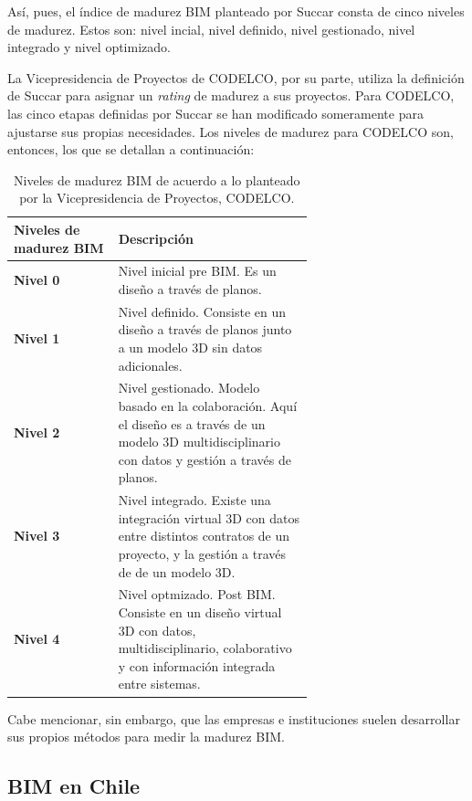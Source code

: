Así, pues, el índice de madurez BIM planteado por Succar consta de cinco niveles de madurez. Estos son: nivel incial, nivel definido, nivel gestionado, nivel integrado y nivel optimizado.

La Vicepresidencia de Proyectos de CODELCO, por su parte, utiliza la definición de Succar para asignar un \textit{rating} de madurez a sus proyectos. Para CODELCO, las cinco etapas definidas por Succar se han modificado someramente para ajustarse sus propias necesidades. Los niveles de madurez para CODELCO son, entonces, los que se detallan a continuación:

\begin{table}[H]
    \centering
    \caption{Niveles de madurez BIM de acuerdo a lo planteado por la Vicepresidencia de Proyectos, CODELCO.}
    \label{tab:niveles-madurez-codelco}
    \begin{tabular}{l p{0.65\linewidth}}
        \toprule
        \textbf{Niveles de madurez BIM} & \textbf{Descripción} \\
        \midrule
        \textbf{Nivel 0} & Nivel inicial pre BIM. Es un diseño a través de planos. \\
        \hline
        \textbf{Nivel 1} & Nivel definido. Consiste en un diseño a través de planos junto a un modelo 3D sin datos adicionales. \\
        \hline
        \textbf{Nivel 2} & Nivel gestionado. Modelo basado en la colaboración. Aquí el diseño es a través de un modelo 3D multidisciplinario con datos y gestión a través de planos. \\
        \hline
        \textbf{Nivel 3} & Nivel integrado. Existe una integración virtual 3D con datos entre distintos contratos de un proyecto, y la gestión a través de de un modelo 3D. \\
        \hline
        \textbf{Nivel 4} & Nivel optmizado. Post BIM. Consiste en un diseño virtual 3D con datos, multidisciplinario, colaborativo y con información integrada entre sistemas. \\
        \bottomrule
    \end{tabular}
\end{table}

Cabe mencionar, sin embargo, que las empresas e instituciones suelen desarrollar sus propios métodos para medir la madurez BIM.

\subsection{BIM en Chile}


